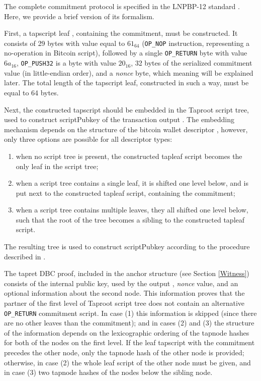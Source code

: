 \documentclass[9pt,oneside]{amsart}
\begin{document}
\begin{multicols}{2}
The complete commitment protocol is specified in the LNPBP-12 standard \cite{LNPBP12}.
Here, we provide a brief version of its formalism.

First, a tapscript leaf \cite{BIP342}, containing the commitment, must be constructed.
It consists of 29 bytes with value equal to $61_{64}$
(\verb|OP_NOP| instruction, representing a no-operation in Bitcoin script),
followed by a single \verb|OP_RETURN| byte with value $6a_{16}$,
\verb|OP_PUSH32| is a byte with value $20_{16}$,
32 bytes of the serialized commitment value (in little-endian order),
and a \emph{nonce} byte, which meaning will be explained later.
The total length of the tapscript leaf, constructed in such a way, must be equal to 64 bytes.

Next, the constructed tapscript should be embedded in the Taproot script tree,
used to construct \textsf{scriptPubkey} of the transaction output \cite{BIP341}.
The embedding mechanism depends on the structure of the bitcoin wallet descriptor \cite{BIP380},
however, only three options are possible for all descriptor types:
\noindent
\begin{enumerate}
\item when no script tree is present,
    the constructed tapleaf script becomes the only leaf in the script tree;
\item when a script tree contains a single leaf, it is shifted one level below,
    and is put next to the constructed tapleaf script, containing the commitment;
\item when a script tree contains multiple leaves, they all shifted one level below,
    such that the root of the tree becomes a sibling to the constructed tapleaf script.
\end{enumerate}
\noindent
The resulting tree is used to construct \textsf{scriptPubkey}
according to the procedure described in \cite{BIP341}.

The tapret DBC proof, included in the \gls{anchor} structure (see Section \ref{Witness})
consists of the internal public key, used by the output \cite{BIP341},
\emph{nonce} value, and an optional information about the second node.
This information proves that the partner of the first level of Taproot script tree
does not contain an alternative \verb|OP_RETURN| commitment script.
In case (1) this information is skipped (since there are no other leaves than the commitment);
and in cases (2) and (3) the structure of the information depends on the lexicographic ordering
of the tapnode hashes \cite{BIP341} for both of the nodes on the first level.
If the leaf tapscript with the commitment precedes the other node,
only the tapnode hash of the other node is provided;
otherwise, in case (2) the whole leaf script of the other node must be given,
and in case (3) two tapnode hashes of the nodes below the sibling node.


\end{multicols}
\end{document}
